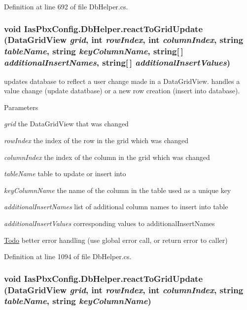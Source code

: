 Definition at line 692 of file DbHelper.cs.\hypertarget{class_ias_pbx_config_1_1_db_helper_a2f4f23f5cdabcac3cdda6e7983bc3d49}{
\subsubsection[{reactToGridUpdate}]{\setlength{\rightskip}{0pt plus 5cm}void IasPbxConfig.DbHelper.reactToGridUpdate (DataGridView {\em grid}, \/  int {\em rowIndex}, \/  int {\em columnIndex}, \/  string {\em tableName}, \/  string {\em keyColumnName}, \/  string\mbox{[}$\,$\mbox{]} {\em additionalInsertNames}, \/  string\mbox{[}$\,$\mbox{]} {\em additionalInsertValues})}}
\label{class_ias_pbx_config_1_1_db_helper_a2f4f23f5cdabcac3cdda6e7983bc3d49}


updates database to reflect a user change made in a DataGridView. handles a value change (update datatbase) or a new row creation (insert into database). 
\begin{DoxyParams}{Parameters}
\item[{\em grid}]the DataGridView that was changed \item[{\em rowIndex}]the index of the row in the grid which was changed \item[{\em columnIndex}]the index of the column in the grid which was changed \item[{\em tableName}]table to update or insert into \item[{\em keyColumnName}]the name of the column in the table used as a unique key \item[{\em additionalInsertNames}]list of additional column names to insert into table \item[{\em additionalInsertValues}]corresponding values to additionalInsertNames \end{DoxyParams}
\begin{Desc}
\item[\hyperlink{todo__todo000026}{Todo}]better error handling (use global error call, or return error to caller) \end{Desc}


Definition at line 1094 of file DbHelper.cs.\hypertarget{class_ias_pbx_config_1_1_db_helper_a1654a203283dc1ce83552b8466d7e19b}{
\subsubsection[{reactToGridUpdate}]{\setlength{\rightskip}{0pt plus 5cm}void IasPbxConfig.DbHelper.reactToGridUpdate (DataGridView {\em grid}, \/  int {\em rowIndex}, \/  int {\em columnIndex}, \/  string {\em tableName}, \/  string {\em keyColumnName})}}
\label{class_ias_pbx_config_1_1_db_helper_a1654a203283dc1ce83552b8466d7e19b}


